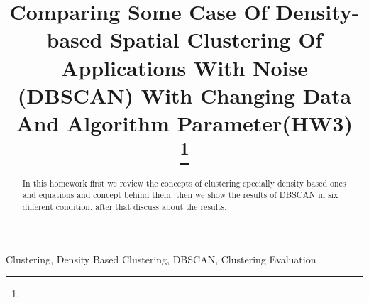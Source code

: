 \documentclass[conference]{IEEEtran}
\begin{document}
\title{Comparing Some Case Of Density-based Spatial Clustering Of Applications With Noise (DBSCAN) With Changing Data And Algorithm Parameter(HW3) \\
	{\footnotesize \textsuperscript{}
	}
	\thanks{}
}

\author{
	}


\maketitle
\begin{abstract}
In this homework first we review the concepts of clustering specially density based ones and equations and concept behind them. then we show the results of DBSCAN in six different condition. after that discuss about the results.
\end{abstract}

\begin{IEEEkeywords}
	 Clustering, Density Based Clustering, DBSCAN, Clustering Evaluation
\end{IEEEkeywords}










\end{document}
